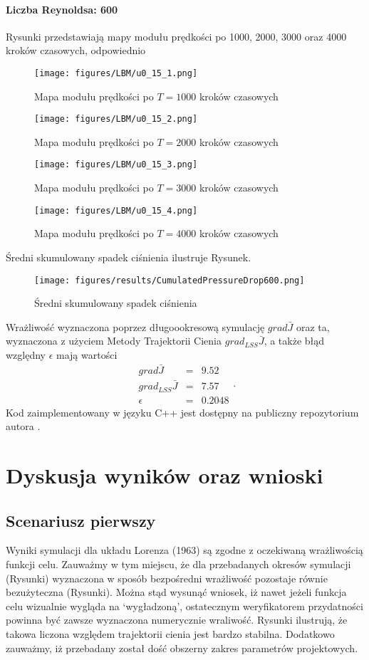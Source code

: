 \documentclass[12pt]{article}
\begin{document}
\paragraph{Liczba Reynoldsa: 600}
Rysunki przedstawiają mapy modułu prędkości po 1000, 2000, 3000 oraz 4000 kroków czasowych, odpowiednio 
\begin{figure}[H]
	\texttt{[image: figures/LBM/u0\_15\_1.png]} 
	\caption{Mapa modułu prędkości po $ T=1000 $ kroków czasowych}
\end{figure}
\begin{figure}[H]
	\texttt{[image: figures/LBM/u0\_15\_2.png]} 
	\caption{Mapa modułu prędkości po $ T=2000 $ kroków czasowych}
\end{figure}
\begin{figure}[H]
	\texttt{[image: figures/LBM/u0\_15\_3.png]} 
	\caption{Mapa modułu prędkości po $ T=3000 $ kroków czasowych}
\end{figure}
\begin{figure}[H]
	\texttt{[image: figures/LBM/u0\_15\_4.png]} 
	\caption{Mapa modułu prędkości po $ T=4000 $ kroków czasowych}
\end{figure}
Średni skumulowany spadek ciśnienia ilustruje Rysunek.
\begin{figure}[H]
	\texttt{[image: figures/results/CumulatedPressureDrop600.png]} 
	\centering
	\caption{Średni skumulowany spadek ciśnienia}
\end{figure}
Wrażliwość wyznaczona poprzez długoookresową symulację $ grad\bar{J} $ oraz ta, wyznaczona z użyciem Metody Trajektorii Cienia $ grad_{LSS}\bar{J} $, a także błąd względny $ \epsilon $ mają wartości
\begin{equation}
\begin{array}{rcl}
grad\bar{J} &=& 9.52 \\
grad_{LSS}\bar{J} &=& 7.57 \\ 
\epsilon &=& 0.2048
\end{array}.
\label{result600}
\end{equation}
Kod zaimplementowany w języku C++ jest dostępny na publiczny repozytorium autora \cite{Marek2}.
\newpage
\section{Dyskusja wyników oraz wnioski}
\subsection{Scenariusz pierwszy}
Wyniki symulacji dla układu Lorenza (1963) są zgodne z oczekiwaną wrażliwością funkcji celu. Zauważmy w tym miejscu, że dla przebadanych okresów symulacji (Rysunki) wyznaczona w sposób bezpośredni wrażliwość pozostaje równie bezużyteczna (Rysunki). Można stąd wysunąć wniosek, iż nawet jeżeli funkcja celu wizualnie wygląda na ‘wygładzoną’, ostatecznym weryfikatorem przydatności powinna być zawsze wyznaczona numerycznie wraliwość. \newline
Rysunki ilustrują, że takowa liczona względem trajektorii cienia jest bardzo stabilna. Dodatkowo zauważmy, iż przebadany został dość obszerny zakres parametrów projektowych. 
\end{document}
